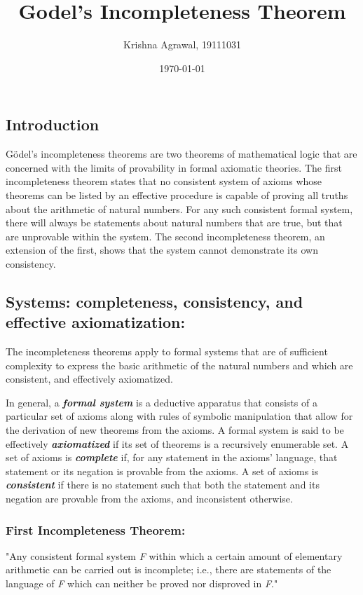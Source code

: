 \documentclass{article}
\title{Godel's Incompleteness Theorem}
\author{Krishna Agrawal, 19111031}
\date{\today}
\begin{document}
\maketitle

\subsection*{Introduction}
Gödel's incompleteness theorems are two theorems of mathematical logic that are concerned with the limits of provability in formal axiomatic theories. The first incompleteness theorem states that no consistent system of axioms whose theorems can be listed by an effective procedure is capable of proving all truths about the arithmetic of natural numbers. For any such consistent formal system, there will always be statements about natural numbers that are true, but that are unprovable within the system. The second incompleteness theorem, an extension of the first, shows that the system cannot demonstrate its own consistency.  


\subsection*{Systems: completeness, consistency, and effective axiomatization:}

The incompleteness theorems apply to formal systems that are of sufficient complexity to express the basic arithmetic of the natural numbers and which are consistent, and effectively axiomatized.

In general, a \textbf{\emph{formal system}} is a deductive apparatus that consists of a particular set of axioms along with rules of symbolic manipulation that allow for the derivation of new theorems from the axioms.
A formal system is said to be effectively \textbf{\emph{axiomatized}} if its set of theorems is a recursively enumerable set.
A set of axioms is \textbf{\emph{complete}} if, for any statement in the axioms' language, that statement or its negation is provable from the axioms.
A set of axioms is \textbf{\emph{consistent}} if there is no statement such that both the statement and its negation are provable from the axioms, and inconsistent otherwise.

\subsubsection*{First Incompleteness Theorem:} "Any consistent formal system \emph{F} within which a certain amount of elementary arithmetic can be carried out is incomplete; i.e., there are statements of the language of \emph{F} which can neither be proved nor disproved in \emph{F}." \\
\end{document}
